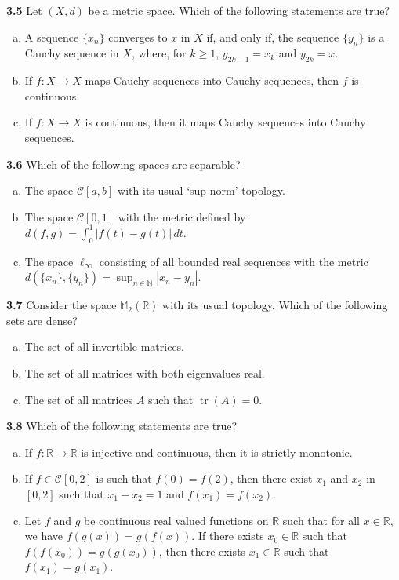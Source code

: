 \documentclass[11pt,a4paper]{article}
\newcommand{\N}{\mathbb{N}}
\newcommand{\R}{\mathbb{R}}
\newcommand{\M}{\mathbb{M}}
\newcommand{\tr}{\operatorname{tr}}
\newcommand{\qitem}[1]{\par\medskip\noindent\textbf{#1}\hspace{0.5em}}
\begin{document}
\qitem{3.5} Let $(X, d)$ be a metric space. Which of the following statements are true?
\begin{enumerate}[a.]
  \item A sequence $\{x_n\}$ converges to $x$ in $X$ if, and only if, the sequence $\{y_n\}$ is a Cauchy sequence in $X$, where, for $k \ge 1$, $y_{2k-1} = x_k$ and $y_{2k} = x$.
  \item If $f : X \to X$ maps Cauchy sequences into Cauchy sequences, then $f$ is continuous.
  \item If $f : X \to X$ is continuous, then it maps Cauchy sequences into Cauchy sequences.
\end{enumerate}

\qitem{3.6} Which of the following spaces are separable?
\begin{enumerate}[a.]
  \item The space $\mathcal{C}[a, b]$ with its usual `sup-norm' topology.
  \item The space $\mathcal{C}[0, 1]$ with the metric defined by $d(f, g) = \int_0^1 |f(t) - g(t)|\,dt$.
  \item The space $\ell_\infty$ consisting of all bounded real sequences with the metric $d(\{x_n\}, \{y_n\}) = \sup_{n \in \N} |x_n - y_n|$.
\end{enumerate}

\qitem{3.7} Consider the space $\M_2(\R)$ with its usual topology. Which of the following sets are dense?
\begin{enumerate}[a.]
  \item The set of all invertible matrices.
  \item The set of all matrices with both eigenvalues real.
  \item The set of all matrices $A$ such that $\tr(A) = 0$.
\end{enumerate}

\qitem{3.8} Which of the following statements are true?
\begin{enumerate}[a.]
  \item If $f : \R \to \R$ is injective and continuous, then it is strictly monotonic.
  \item If $f \in \mathcal{C}[0, 2]$ is such that $f(0) = f(2)$, then there exist $x_1$ and $x_2$ in $[0, 2]$ such that $x_1 - x_2 = 1$ and $f(x_1) = f(x_2)$.
  \item Let $f$ and $g$ be continuous real valued functions on $\R$ such that for all $x \in \R$, we have $f(g(x)) = g(f(x))$. If there exists $x_0 \in \R$ such that $f(f(x_0)) = g(g(x_0))$, then there exists $x_1 \in \R$ such that $f(x_1) = g(x_1)$.
\end{enumerate}
\end{document}
